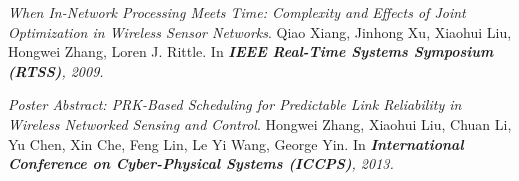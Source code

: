 \begin{thebibliography}{8}
\emph{When In-Network Processing Meets Time: Complexity and Effects of Joint Optimization in Wireless Sensor Networks}. Qiao Xiang, Jinhong Xu, Xiaohui Liu, Hongwei Zhang, Loren J. Rittle. In \emph{\textbf{IEEE Real-Time Systems Symposium (RTSS)}, 2009.}

\emph{Poster Abstract: PRK-Based Scheduling for Predictable Link Reliability in Wireless Networked Sensing and Control}. Hongwei Zhang, Xiaohui Liu, Chuan Li, Yu Chen, Xin Che, Feng Lin, Le Yi Wang, George Yin. In \emph{\textbf{International Conference on Cyber-Physical Systems (ICCPS)}, 2013.}
\end{thebibliography}

